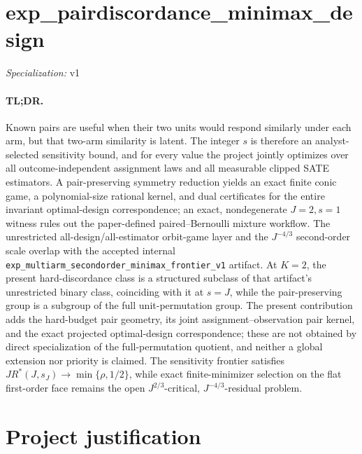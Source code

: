 \documentclass{article}
\begin{document}
\sloppy

\section*{exp\_\allowbreak{}pairdiscordance\_\allowbreak{}minimax\_\allowbreak{}design}

\noindent\textit{Specialization:} v1\par

\paragraph{TL;DR.} Known pairs are useful when their two units would respond similarly under each arm, but that two-arm similarity is latent. The integer \(s\) is therefore an analyst-selected sensitivity bound, and for every value the project jointly optimizes over all outcome-independent assignment laws and all measurable clipped SATE estimators. A pair-preserving symmetry reduction yields an exact finite conic game, a polynomial-size rational kernel, and dual certificates for the entire invariant optimal-design correspondence; an exact, nondegenerate \(J=2,s=1\) witness rules out the paper-defined paired--Bernoulli mixture workflow. The unrestricted all-design/all-estimator orbit-game layer and the \(J^{-4/3}\) second-order scale overlap with the accepted internal \texttt{exp\_multiarm\_secondorder\_minimax\_frontier\_v1} artifact. At \(K=2\), the present hard-discordance class is a structured subclass of that artifact's unrestricted binary class, coinciding with it at \(s=J\), while the pair-preserving group is a subgroup of the full unit-permutation group. The present contribution adds the hard-budget pair geometry, its joint assignment--observation pair kernel, and the exact projected optimal-design correspondence; these are not obtained by direct specialization of the full-permutation quotient, and neither a global extension nor priority is claimed. The sensitivity frontier satisfies \(J R^*(J,s_J)\to\min\{\rho,1/2\}\), while exact finite-minimizer selection on the flat first-order face remains the open \(J^{2/3}\)-critical, \(J^{-4/3}\)-residual problem.

\section{Project justification}
\end{document}

